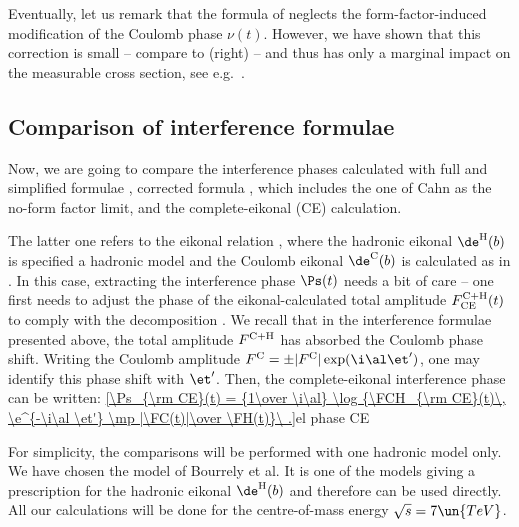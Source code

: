 Eventually, let us remark that the formula of \KaL{} neglects the form-factor-induced modification of the Coulomb phase $\nu(t)$. However, we have shown that this correction is small -- compare  to  (right) -- and thus has only a marginal impact on the measurable cross section, see e.g.~.


\subsection[int cmp]{Comparison of interference formulae}

Now, we are going to compare the interference phases calculated with
\> full and simplified \WY{} formulae ,
\> corrected \KL{} formula , which includes the one of Cahn as the no-form factor limit, and
\> the complete-eikonal (CE) calculation.

\noindent The latter one refers to the eikonal relation , where the hadronic eikonal $\de^{\rm H}(b)$ is specified a hadronic model and the Coulomb eikonal $\de^{\rm C}(b)$ is calculated as in . In this case, extracting the interference phase $\Ps(t)$ needs a bit of care -- one first needs to adjust the phase of the eikonal-calculated total amplitude $F^{\rm C+H}_{\rm CE}(t)$ to comply with the decomposition . We recall that in the interference formulae presented above, the total amplitude $F^{\rm C+H}$ has absorbed the Coulomb phase shift. Writing the Coulomb amplitude $\FC = \pm |\FC| \exp(\i\al\et')$, one may identify this phase shift with $\et'$. Then, the complete-eikonal interference phase can be written:
\eqref{\Ps_{\rm CE}(t) = {1\over \i\al} \log {\FCH_{\rm CE}(t)\, \e^{-\i\al \et'} \mp |\FC(t)|\over \FH(t)}\ .}{el phase CE}

For simplicity, the comparisons will be performed with one hadronic model only. We have chosen the model of Bourrely et al. It is one of the models giving a prescription for the hadronic eikonal $\de^{\rm H}(b)$ and therefore  can be used directly. All our calculations will be done for the centre-of-mass energy $\sqrt s = 7\un{TeV}$.


